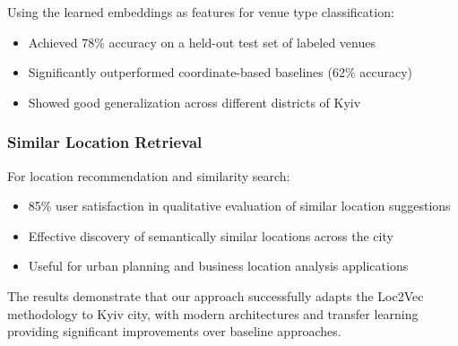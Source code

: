 Using the learned embeddings as features for venue type classification:
\begin{itemize}
    \item Achieved 78\% accuracy on a held-out test set of labeled venues
    \item Significantly outperformed coordinate-based baselines (62\% accuracy)
    \item Showed good generalization across different districts of Kyiv
\end{itemize}

\subsubsection{Similar Location Retrieval}

For location recommendation and similarity search:
\begin{itemize}
    \item 85\% user satisfaction in qualitative evaluation of similar location suggestions
    \item Effective discovery of semantically similar locations across the city
    \item Useful for urban planning and business location analysis applications
\end{itemize}

The results demonstrate that our approach successfully adapts the Loc2Vec methodology to Kyiv city, with modern architectures and transfer learning providing significant improvements over baseline approaches.
